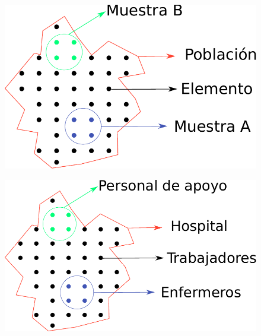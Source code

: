 \documentclass[11pt]{beamer}
\begin{document}
    \begin{frame}{}
      \begin{figure}
        \centering
          \includegraphics[width=0.9\linewidth]{images/Lecture_1e}
        \label{fig:lecture1e}
      \end{figure}
    \end{frame}
    \begin{frame}{}
      \begin{figure}
        \centering
        \includegraphics[width=0.9\linewidth]{images/Lecture_1f}
        \label{fig:lecture1f}
      \end{figure}
    \end{frame}
\end{document}
